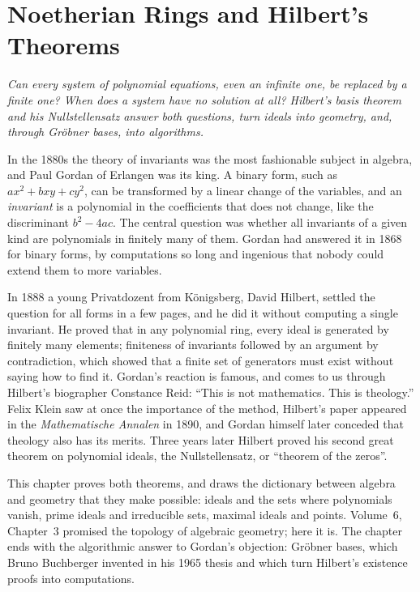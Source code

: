 \chapter{Noetherian Rings and Hilbert's Theorems}

\begin{center}\itshape
Can every system of polynomial equations, even an infinite one, be replaced by a finite one? When does a system have no solution at all? Hilbert's basis theorem and his
Nullstellensatz answer both questions, turn ideals into geometry, and, through Gröbner bases, into algorithms.
\end{center}

In the 1880s the theory of invariants was the most fashionable subject in algebra, and Paul Gordan of Erlangen was its king. A binary form, such as $ax^2+bxy+cy^2$, can be
transformed by a linear change of the variables, and an \emph{invariant} is a polynomial in the coefficients that does not change, like the discriminant $b^2-4ac$. The central
question was whether all invariants of a given kind are polynomials in finitely many of them. Gordan had answered it in 1868 for binary forms, by computations so long and
ingenious that nobody could extend them to more variables.

In 1888 a young Privatdozent from Königsberg, David Hilbert, settled the question for all forms in a few pages, and he did it without computing a single invariant. He proved that
in any polynomial ring, every ideal is generated by finitely many elements; finiteness of invariants followed by an argument by contradiction, which showed that a finite set of
generators must exist without saying how to find it. Gordan's reaction is famous, and comes to us through Hilbert's biographer Constance Reid: ``This is not mathematics. This is
theology.'' Felix Klein saw at once the importance of the method, Hilbert's paper appeared in the \emph{Mathematische Annalen} in 1890, and Gordan himself later conceded that
theology also has its merits. Three years later Hilbert proved his second great theorem on polynomial ideals, the Nullstellensatz, or ``theorem of the zeros''.

This chapter proves both theorems, and draws the dictionary between algebra and geometry that they make possible: ideals and the sets where polynomials vanish, prime ideals and
irreducible sets, maximal ideals and points. Volume~6, Chapter~3 promised the topology of algebraic geometry; here it is. The chapter ends with the algorithmic answer to Gordan's
objection: Gröbner bases, which Bruno Buchberger invented in his 1965 thesis and which turn Hilbert's existence proofs into computations.

